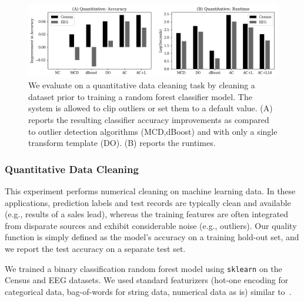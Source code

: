\begin{figure}
    \centering
    \includegraphics[width=\columnwidth]{exp/exp2.png}
    \caption{ We evaluate \sys on a quantitative data cleaning task by cleaning a dataset prior to training a random forest classifier model. The system is allowed to clip outliers or set them to a default value. (A) reports the resulting classifier accuracy improvements as compared to outlier detection algorithms (MCD,dBoost) and \sys with only a single transform template (DO).  (B) reports the runtimes.  \label{exp2a}}
\end{figure}

\subsubsection{Quantitative Data Cleaning}
This experiment performs numerical cleaning on machine learning data.  In these applications, prediction labels and test records are typically clean and available (e.g., results of a sales lead), whereas the training features are often integrated from disparate sources and exhibit considerable noise (e.g., outliers).  Our quality function is simply defined as the model's accuracy on a training hold-out set, and we report the test accuracy on a separate test set.

We trained a binary classification random forest model using \texttt{sklearn} on the Census and EEG datasets.  We used standard featurizers (hot-one encoding for categorical data, bag-of-words for string data, numerical data as is) similar to~\cite{gokhale2014corleone}. 





